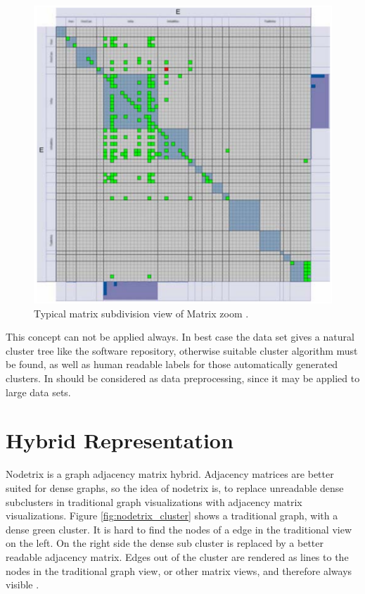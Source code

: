 \begin{figure}[h]
\centering
\includegraphics[width=\textwidth/2]{images/matrixzoom_cluster}
\caption{Typical matrix subdivision view of Matrix zoom \citep{ham2005phd}. \label{fig:matrixzoom_cluster}}
\end{figure}

This concept can not be applied always. In best case the data set gives a natural cluster tree like the software repository, otherwise suitable cluster algorithm must be found, as well as human readable labels for those automatically generated clusters. In should be considered as data preprocessing, since it may be applied to large data sets.













\section{Hybrid Representation}
Nodetrix is a graph adjacency matrix hybrid. Adjacency matrices are better suited for dense graphs, so the idea of nodetrix is, to replace unreadable dense subclusters in traditional graph visualizations with adjacency matrix visualizations. Figure \ref{fig:nodetrix_cluster} shows a traditional graph, with a dense green cluster. It is hard to find the nodes of a edge in the traditional view on the left. On the right side the dense sub cluster is replaced by a better readable  adjacency matrix. Edges out of the cluster are rendered as lines to the nodes in the traditional graph view, or other matrix views, and therefore always visible \citep{henry-nodetrix-2007}.



